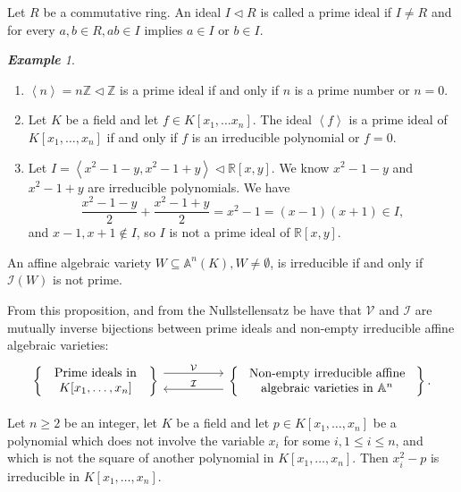 \documentclass[titlepage]{article}
\theoremstyle{remark}
\newtheorem{example}[definition]{\textbf{Example}}
\newcommand{\idealof}{\vartriangleleft}
\begin{document}
  \begin{definition}
    Let $R$ be a commutative ring. An ideal $I\idealof R$ is called a prime ideal if $I\ne R$ and for every $a,b\in R,ab\in I$ implies $a\in I$ or $b\in I$.
  \end{definition}
  \begin{example}$ $
    \begin{enumerate}
      \item $\left\langle n\right\rangle=n \mathbb{Z}\idealof \mathbb{Z}$ is a prime ideal if and only if $n$ is a prime number or $n=0$.
      \item Let $K$ be a field and let $f\in K[x_1,\dots x_n]$. The ideal $\left\langle f\right\rangle$ is a prime ideal of $K[x_1,\dots,x_n]$ if and only if $f$ is an irreducible polynomial or $f=0$.
      \item Let $I=\left\langle x^2-1-y,x^2-1+y\right\rangle\idealof \mathbb{R}[x,y]$. We know $x^2-1-y$ and $x^2-1+y$ are irreducible polynomials. We have
        \[\frac{x^2-1-y}{2}+\frac{x^2-1+y}{2}=x^2-1=(x-1)(x+1)\in I,\]
        and $x-1,x+1\notin I$, so $I$ is not a prime ideal of $\mathbb{R}[x,y]$.
    \end{enumerate}
  \end{example}
  \begin{proposition}
    An affine algebraic variety $W\subseteq\mathbb{A}^n(K),W\ne\emptyset$, is irreducible if and only if $\mathcal{I}(W)$ is not prime.
  \end{proposition}
  From this proposition, and from the Nullstellensatz be have that $\mathcal{V}$ and $\mathcal{I}$ are mutually inverse bijections between prime ideals and non-empty irreducible affine algebraic varieties:
  \[
    \begin{tikzcd}[column sep=huge]
      \left\{\parbox{3cm}{\centering Prime ideals in\\ $K[x_1,\ldots,x_n]$}\right\}
      \arrow[r, "\mathcal{V}", shift left=1.5ex]
      \arrow[r, "\mathcal{I}", leftarrow, shift right=1.5ex]
      &
      \left\{\parbox{5cm}{\centering Non-empty irreducible affine\\ algebraic varieties in $\mathbb{A}^n$}\right\}.
    \end{tikzcd}
  \]
  \begin{lemma}
    Let $n\ge2$ be an integer, let $K$ be a field and let $p\in K[x_1,\dots,x_n]$ be a polynomial which does not involve the variable $x_i$ for some $i, 1\le i\le n$, and which is not the square of another polynomial in $K[x_1,\dots,x_n]$. Then $x_i^2-p$ is irreducible in $K[x_1,\dots,x_n]$.
  \end{lemma}
\end{document}
